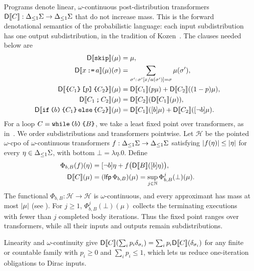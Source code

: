Programs denote linear, $\omega$-continuous post-distribution transformers $\mathsf{D}\llbracket C\rrbracket:{\Delta_{\leq 1} \Sigma}\to{\Delta_{\leq 1}\Sigma}$ that do not increase mass. This is the forward denotational semantics of the probabilistic language: each input subdistribution has one output subdistribution, in the tradition of Kozen~\cite{DBLP:conf/focs/Kozen79,DBLP:conf/stoc/Kozen83}. The clauses needed below are
\begin{align*}
 \mathsf{D}\llbracket \textnormal{\texttt{skip}}\rrbracket(\mu) &= \mu,\\
 \mathsf{D}\llbracket x\,\textnormal{\texttt{:=}}\, a\rrbracket(\mu)(\sigma)
   &= \sum_{\sigma':\,\sigma'[x/a(\sigma')]=\sigma}\mu(\sigma'),\\
 \mathsf{D}\llbracket \textnormal{\texttt{\{}} C_1\textnormal{\texttt{\}}} \, \textnormal{\texttt{[}} p\textnormal{\texttt{]}} \, \textnormal{\texttt{\{}} C_2\textnormal{\texttt{\}}}\rrbracket(\mu)
   &= \mathsf{D}\llbracket C_1\rrbracket(p\mu)+\mathsf{D}\llbracket C_2\rrbracket((1-p)\mu),\\
 \mathsf{D}\llbracket C_1\,\textnormal{\texttt{;}}\, C_2\rrbracket(\mu)
   &= \mathsf{D}\llbracket C_2\rrbracket(\mathsf{D}\llbracket C_1\rrbracket(\mu)),\\
 \mathsf{D}\llbracket \textnormal{\texttt{if}}\,\textnormal{\texttt{(}} b\textnormal{\texttt{)}}\,\textnormal{\texttt{\{}} C_1\textnormal{\texttt{\}}}\,\textnormal{\texttt{else}}\,\textnormal{\texttt{\{}} C_2\textnormal{\texttt{\}}}\rrbracket(\mu)
   &= \mathsf{D}\llbracket C_1\rrbracket([b]\mu)+\mathsf{D}\llbracket C_2\rrbracket([\neg b]\mu).
\end{align*}
For a loop $C=\textnormal{\texttt{while}}\,\textnormal{\texttt{(}} b\textnormal{\texttt{)}}\,\textnormal{\texttt{\{}} B\textnormal{\texttt{\}}}$, we take a least fixed point over transformers, as in~\cite{zilken2026verifyingsamplingalgorithmsdistributional}. We order subdistributions and transformers pointwise. Let $\mathcal{H}$ be the pointed $\omega$-cpo of $\omega$-continuous transformers $f:{\Delta_{\leq 1} \Sigma}\to{\Delta_{\leq 1}\Sigma}$ satisfying $|f(\eta)|\leq|\eta|$ for every $\eta\in{\Delta_{\leq 1}\Sigma}$, with bottom $\bot=\lambda\eta.0$. Define
\begin{equation}
\label{eq:while-transformer-fixpoint}
 \begin{aligned}
  \Phi_{b,B}(f)(\eta)
    &= [\neg b]\eta+f\bigl(\mathsf{D}\llbracket B\rrbracket([b]\eta)\bigr),\\
  \mathsf{D}\llbracket C\rrbracket(\mu)
    &= (\mathsf{lfp\,}\Phi_{b,B})(\mu)
     = \sup_{j\in\mathbb{N}}\Phi_{b,B}^{j}(\bot)(\mu).
 \end{aligned}
\end{equation}
The functional $\Phi_{b,B}:\mathcal{H}\to\mathcal{H}$ is $\omega$-continuous, and every approximant has mass at most $|\mu|$ (see ). For $j\geq1$, $\Phi_{b,B}^{j}(\bot)(\mu)$ collects the terminating executions with fewer than $j$ completed body iterations. Thus the fixed point ranges over transformers, while all their inputs and outputs remain subdistributions.

Linearity and $\omega$-continuity give
$\mathsf{D}\llbracket C\rrbracket(\sum_i p_i\delta_{\sigma_i})=\sum_i p_i\mathsf{D}\llbracket C\rrbracket(\delta_{\sigma_i})$ for any finite or countable family with $p_i\geq0$ and $\sum_i p_i\leq1$, which lets us reduce one-iteration obligations to Dirac inputs.

